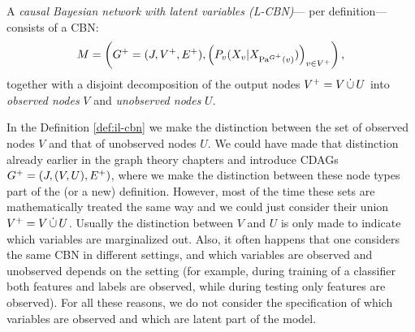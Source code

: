 \begin{Def}\label{def:il-cbn}
    A \emph{causal Bayesian network with latent variables (L-CBN)}--- per 
    definition---consists of a CBN:
    \[ M= \left ( G^+=(J,V^+,E^+), \left ( P_v(X_v|X_{\mathrm{Pa}^{G^+}(v)}) \right )_{v \in V^+} \right ), \]
    together with a disjoint decomposition of the output nodes $V^+=V \,\dot{\cup}\, U$ into 
    \emph{observed nodes} $V$ and \emph{unobserved nodes} $U$.
\end{Def}


\begin{Rem}
    In the Definition \ref{def:il-cbn} we make the distinction between the set of observed nodes $V$ and that of unobserved nodes $U$.
    We could have made that distinction already earlier in the graph theory chapters and introduce CDAGs
    $G^+ = \left ( J, (V,U),E^+ \right )$, where we make the distinction between these node types part of the (or a new) definition.
    However, most of the time these sets are mathematically treated the same way and we could just consider 
    their union $V^+= V \,\dot{\cup}\, U$. Usually the distinction between $V$ and $U$ is only made to indicate which variables are marginalized out.
    Also, it often happens that one considers the same CBN in different settings, and which variables are observed and unobserved depends on the setting (for example, during training of a classifier both features and labels are observed, while during testing only features are observed).
    For all these reasons, we do not consider the specification of which variables are observed and which are latent part of the model.
\end{Rem}



